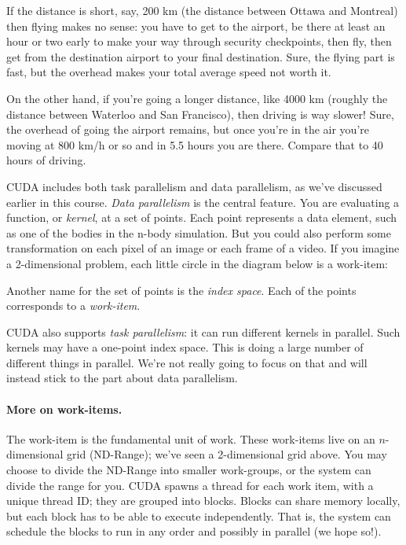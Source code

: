 \documentclass[a4paper]{report}
\begin{document}
If the distance is short, say, 200 km (the distance between Ottawa and Montreal) then flying makes no sense: you have to get to the airport, be there at least an hour or two early to make your way through security checkpoints, then fly, then get from the destination airport to your final destination. Sure, the flying part is fast, but the overhead makes your total average speed not worth it.

On the other hand, if you're going a longer distance, like 4000 km (roughly the distance between Waterloo and San Francisco), then driving is way slower! Sure, the overhead of going the airport remains, but once you're in the air you're moving at 800 km/h or so and in 5.5 hours you are there. Compare that to 40 hours of driving.

CUDA includes both task parallelism and data parallelism, as we've
discussed earlier in this course. \emph{Data parallelism} is the central
feature. You are evaluating a function, or \emph{kernel},
at a set of points. Each point represents a data element, such as one of the
bodies in the n-body simulation. But you could also perform some 
transformation on each pixel of an image or each frame of a video. If you 
imagine a 2-dimensional problem, each little circle in the diagram below is
a work-item:

\begin{center}
\end{center}

Another name for the set of points is the \emph{index space}. 
Each of the points corresponds to a \emph{work-item}.

CUDA also supports \emph{task parallelism}: it can run different
kernels in parallel. Such kernels may have a one-point index space. This is
doing a large number of different things in parallel. We're not really going
to focus on that and will instead stick to the part about data parallelism.

\paragraph{More on work-items.} The work-item is the fundamental
unit of work. These work-items live on an $n$-dimensional
grid (ND-Range); we've seen a 2-dimensional grid above. You may choose
to divide the ND-Range into smaller work-groups, or the system can
divide the range for you. CUDA spawns a thread for each work item,
with a unique thread ID; they are grouped into blocks. Blocks can share 
memory locally, but each block has to be able to execute independently.
That is, the system can schedule the blocks to run in any order and possibly
in parallel (we hope so!). 
\end{document}
